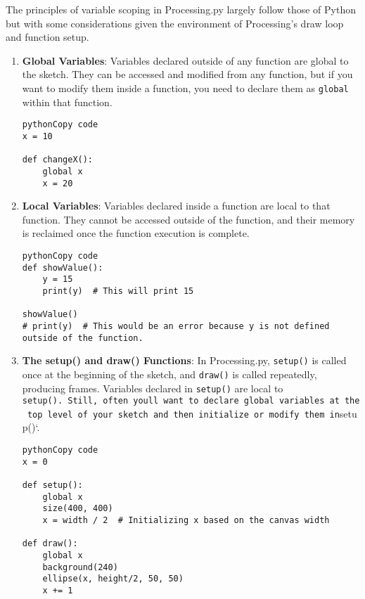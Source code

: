 \documentclass[
]{article}
\author{}
\date{}
\begin{document}
The principles of variable scoping in Processing.py largely follow those
of Python but with some considerations given the environment of
Processing's draw loop and function setup.

\begin{enumerate}
\def\labelenumi{\arabic{enumi}.}
\item
  \textbf{Global Variables}: Variables declared outside of any function
  are global to the sketch. They can be accessed and modified from any
  function, but if you want to modify them inside a function, you need
  to declare them as \texttt{global} within that function.

\begin{verbatim}
pythonCopy code
x = 10

def changeX():
    global x
    x = 20
\end{verbatim}
\item
  \textbf{Local Variables}: Variables declared inside a function are
  local to that function. They cannot be accessed outside of the
  function, and their memory is reclaimed once the function execution is
  complete.

\begin{verbatim}
pythonCopy code
def showValue():
    y = 15
    print(y)  # This will print 15
    
showValue()
# print(y)  # This would be an error because y is not defined outside of the function.
\end{verbatim}
\item
  \textbf{The setup() and draw() Functions}: In Processing.py,
  \texttt{setup()} is called once at the beginning of the sketch, and
  \texttt{draw()} is called repeatedly, producing frames. Variables
  declared in \texttt{setup()} are local to
  \texttt{setup().\ Still,\ often\ you\textquotesingle{}ll\ want\ to\ declare\ global\ variables\ at\ the\ top\ level\ of\ your\ sketch\ and\ then\ initialize\ or\ modify\ them\ in}setup()`.

\begin{verbatim}
pythonCopy code
x = 0

def setup():
    global x
    size(400, 400)
    x = width / 2  # Initializing x based on the canvas width
    
def draw():
    global x
    background(240)
    ellipse(x, height/2, 50, 50)
    x += 1
\end{verbatim}
\end{enumerate}
\end{document}
